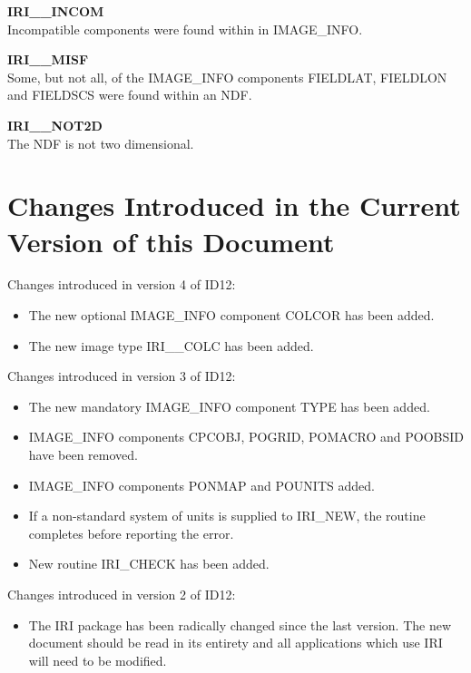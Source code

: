\begin{description}
\item {\bf IRI\_\_INCOM}\\
Incompatible components were found within in IMAGE\_INFO.

\item {\bf IRI\_\_MISF}\\
Some, but not all, of the IMAGE\_INFO components FIELDLAT, FIELDLON and FIELDSCS
were found within an NDF.

\item {\bf IRI\_\_NOT2D}\\
The NDF is not two dimensional.

\end{description}

\section{Changes Introduced in the Current Version of this Document}
\label {SEC:CHANGES}

Changes introduced in version 4 of ID12:
\begin{itemize}
\item The new optional IMAGE\_INFO component COLCOR has been added.
\item The new image type IRI\_\_COLC has been added.
\end{itemize}

Changes introduced in version 3 of ID12:
\begin{itemize}
\item The new mandatory IMAGE\_INFO component TYPE has been added.
\item IMAGE\_INFO components CPCOBJ, POGRID, POMACRO and POOBSID have been
removed.
\item IMAGE\_INFO components PONMAP and POUNITS added.
\item If a non-standard system of units is supplied to IRI\_NEW, the routine
completes before reporting the error.
\item New routine IRI\_CHECK has been added.
\end{itemize}

Changes introduced in version 2 of ID12:
\begin{itemize}
\item The IRI package has been radically changed since the last version. The new
document should be read in its entirety and all applications which use IRI will
need to be modified.
\end{itemize}


